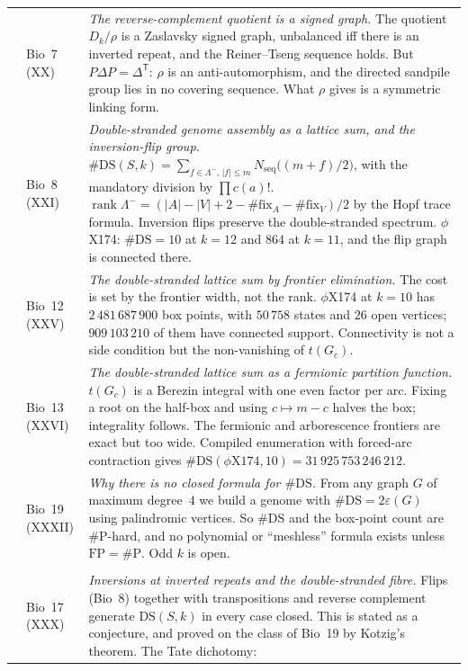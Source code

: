 \documentclass[11pt]{article}
\newcommand{\DS}{\mathrm{DS}}
\newcommand{\Lm}{\Lambda^{-}}
\newcommand{\sP}{\#\mathrm{P}}
\newcommand{\Nseq}{N_{\mathrm{seq}}}
\begin{document}
\begin{longtable}{>{\raggedright\arraybackslash}p{}>{\raggedright\arraybackslash}p{}>{\raggedright\arraybackslash}p{}}
6 & Bio~7 (XX) & \emph{The reverse-complement quotient is a signed graph.} The quotient $D_k/\rho$ is a
Zaslavsky signed graph, unbalanced iff there is an inverted repeat, and the Reiner--Tseng sequence holds.
But $P\Delta P=\Delta^{\mathsf T}$: $\rho$ is an anti-automorphism, and the directed sandpile group lies
in no covering sequence. What $\rho$ gives is a symmetric linking form.\\
7 & Bio~8 (XXI) & \emph{Double-stranded genome assembly as a lattice sum, and the inversion-flip group.}
$\#\DS(S,k)=\sum_{f\in\Lm,\,|f|\le m}\Nseq\bigl((m+f)/2\bigr)$, with the mandatory division by
$\prod c(a)!$. $\operatorname{rank}\Lm=(|A|-|V|+2-\#\mathrm{fix}_A-\#\mathrm{fix}_V)/2$ by the Hopf trace formula.
Inversion flips preserve the double-stranded spectrum. $\phi$X174: $\#\DS=10$ at $k=12$ and $864$ at
$k=11$, and the flip graph is connected there.\\
8 & Bio~12 (XXV) & \emph{The double-stranded lattice sum by frontier elimination.} The cost is set by the
frontier width, not the rank. $\phi$X174 at $k=10$ has $2\,481\,687\,900$ box points, with $50\,758$
states and $26$ open vertices; $909\,103\,210$ of them have connected support. Connectivity is not a side
condition but the non-vanishing of $t(G_c)$.\\
9 & Bio~13 (XXVI) & \emph{The double-stranded lattice sum as a fermionic partition function.}
$t(G_c)$ is a Berezin integral with one even factor per arc. Fixing a root on the half-box and using
$c\mapsto m-c$ halves the box; integrality follows. The fermionic and arborescence frontiers are exact but
too wide. Compiled enumeration with forced-arc contraction gives
$\#\DS(\phi\mathrm X174,10)=31\,925\,753\,246\,212$.\\
10 & Bio~19 (XXXII) & \emph{Why there is no closed formula for $\#\DS$.} From any graph $G$ of maximum
degree~$4$ we build a genome with $\#\DS=2\varepsilon(G)$ using palindromic vertices. So $\#\DS$ and the
box-point count are $\sP$-hard, and no polynomial or ``meshless'' formula exists unless
$\mathrm{FP}=\sP$. Odd $k$ is open.\\[4pt]
\multicolumn{3}{l}{\textbf{Part III. Spectral fibres and rearrangements}}\\[2pt]
11 & Bio~17 (XXX) & \emph{Inversions at inverted repeats and the double-stranded fibre.} Flips (Bio~8)
together with transpositions and reverse complement generate $\DS(S,k)$ in every case closed. This is
stated as a conjecture, and proved on the class of Bio~19 by Kotzig's theorem. The Tate dichotomy:

\end{longtable}
\end{document}
